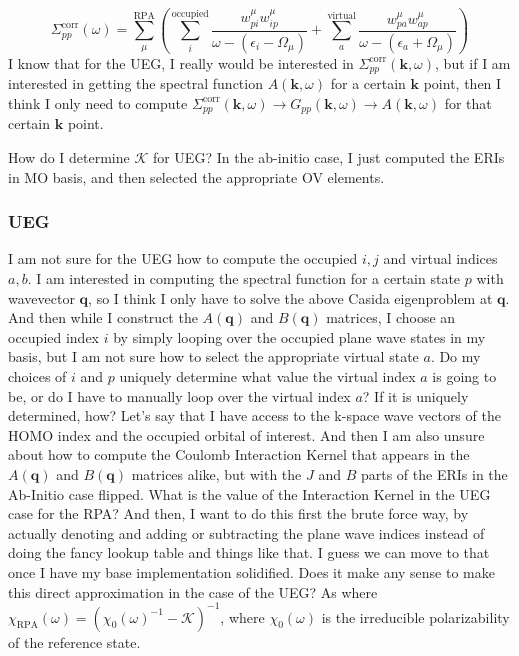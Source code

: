 \begin{equation}
    \Sigma_{pp}^{\text{corr}}(\omega) = \sum_{\mu }^{\text{RPA}}\left(\sum_{i}^{\text{occupied}} \frac{w_{pi}^{\mu }w_{ip}^{\mu }}{\omega -(\epsilon _{i}-\Omega  _{\mu })}+ \sum_{a}^{\text{virtual}} \frac{w_{pa}^{\mu }w_{ap}^{\mu }}{\omega -(\epsilon _{a}+\Omega  _{\mu })}\right)
\end{equation}
I know that for the UEG, I really would be interested in $\Sigma_{pp}^{\text{corr}}(\bm{k},\omega)$, but if I am interested in getting the spectral function $A(\bm{k},\omega)$ for a certain $\bm{k}$ point, then I think I only need to compute $\Sigma_{pp}^{\text{corr}}(\bm{k},\omega)\rightarrow G_{pp}(\bm{k},\omega)\rightarrow A(\bm{k},\omega)$ for that certain $\bm{k}$ point. 

How do I determine $\mathcal{K}$ for UEG? In the ab-initio case, I just computed the ERIs in MO basis, and then selected the appropriate OV elements.
\subsubsection{UEG}
I am not sure for the UEG how to compute the occupied $i,j$ and virtual indices $a,b$. I am interested in computing the spectral function for a certain state $p$ with wavevector $\bm{q}$, so I think I only have to solve the above Casida eigenproblem at $\bm{q}$. And then while I construct the $A(\bm{q})$ and $B(\bm{q})$ matrices, I choose an occupied index $i$ by simply looping over the occupied plane wave states in my basis, but I am not sure how to select the appropriate virtual state $a$. Do my choices of $i$ and $p$ uniquely determine what value the virtual index $a$ is going to be, or do I have to manually loop over the virtual index $a$? If it is uniquely determined, how? Let's say that I have access to the k-space wave vectors of the HOMO index and the occupied orbital of interest. And then I am also unsure about how to compute the Coulomb Interaction Kernel that appears in the $A(\bm{q})$ and $B(\bm{q})$ matrices alike, but with the $J$ and $B$ parts of the ERIs in the Ab-Initio case flipped. What is the value of the Interaction Kernel in the UEG case for the RPA? And then, I want to do this first the brute force way, by actually denoting and adding or subtracting the plane wave indices instead of doing the fancy lookup table and things like that. I guess we can move to that once I have my base implementation solidified.
Does it make any sense to make this direct approximation in the case of the UEG? As
where $\chi_{\text{RPA}}(\omega)=\left(\chi_0(\omega)^{-1}-\mathcal{K}\right)^{-1}$, where $\chi_0(\omega)$ is the irreducible polarizability of the reference state.

